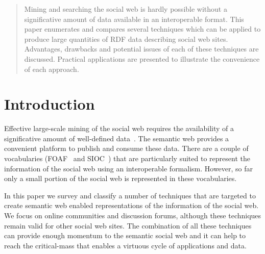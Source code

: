 \documentclass{../templates/www2008-submission}
\begin{document}


\maketitle

\begin{abstract}
Mining and searching the social web is hardly possible without
a significative amount of data available in an interoperable
format. This paper enumerates and compares several techniques which can be
applied to produce large quantities of RDF data describing
social web sites. Advantages, drawbacks and potential issues of
each of these techniques are discussed. Practical applications
are presented to illustrate the convenience of each approach.
\end{abstract}



\section{Introduction}

Effective large-scale mining of the social web requires the
availability of a significative amount of well-defined data~\cite{Mika2004}.
The semantic web provides a convenient platform to publish and
consume these data. There are a couple of vocabularies (FOAF~\cite{FOAF} and
SIOC~\cite{Bojars2007}) that are particularly suited to represent the
information of the social web using an interoperable formalism.
However, so far only a small portion of the social web is
represented in these vocabularies.

In this paper we survey and classify a number of techniques that
are targeted to create semantic web enabled representations of
the information of the social web. We focus on online communities
and discussion forums, although these techniques remain valid
for other social web sites. The combination of all these
techniques can provide enough momentum to the semantic social
web and it can help to reach the critical-mass that
enables a virtuous cycle of applications and data.
\end{document}
